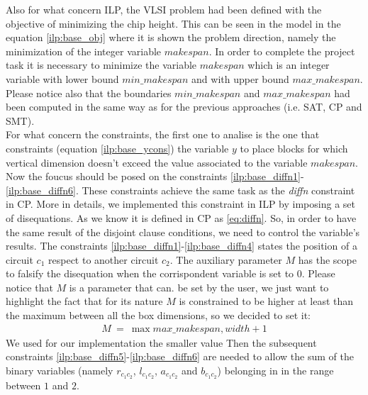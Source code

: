     Also for what concern ILP, the VLSI problem had been defined with the objective of minimizing 
    the chip height. This can be seen in the model in the equation \ref{ilp:base_obj} where it is
    shown the problem direction, namely the minimization of the integer variable \(makespan\).
    In order to complete the project task it is necessary to minimize the variable \(makespan\) which
    is an integer variable with lower bound $min\_makespan$ and with upper bound $max\_makespan$.
    Please notice also that the  boundaries $min\_makespan$ and $max\_makespan$ had been computed
    in the same way as for the previous approaches (i.e. SAT, CP and SMT).\\

    For what concern the constraints, the first one to analise is the one that constraints
    (equation \ref{ilp:base_ycons}) the variable $y$ to place blocks for which vertical dimension
    doesn't exceed the value associated to the variable $makespan$.\\

    Now the foucus should be posed on the constraints \ref{ilp:base_diffn1}-\ref{ilp:base_diffn6}.
    These constraints achieve the same task as the \textit{diffn} constraint in CP. More in
    details, we implemented this constraint in ILP by imposing a set of disequations. As we know
    it is defined in CP as \ref{eq:diffn}. So, in order to have the same result of the disjoint
    clause conditions, we need to control the variable's results. The constraints 
    \ref{ilp:base_diffn1}-\ref{ilp:base_diffn4} states the position of a circuit $c_1$ respect to
    another circuit $c_2$. The auxiliary parameter $M$ has the scope to falsify the disequation
    when the corrispondent variable is set to 0. Please notice that \(M\) is a parameter that can.
    be set by the user, we just want to highlight the fact that for its nature \(M\) is constrained
    to be higher at least than the maximum between all the box dimensions, so we decided to set it:
    \begin{align*}
        M\ =\ \max{max\_makespan, width} + 1 
    \end{align*}
    We used for our implementation the smaller value Then the subsequent constraints 
    \ref{ilp:base_diffn5}-\ref{ilp:base_diffn6} are needed to allow the sum of the binary variables 
    (namely $r_{c_1c_2}$, $l_{c_1c_2}$, $a_{c_1c_2}$ and $b_{c_1c_2}$) belonging in in the range
    between $1$ and $2$. \\
    
